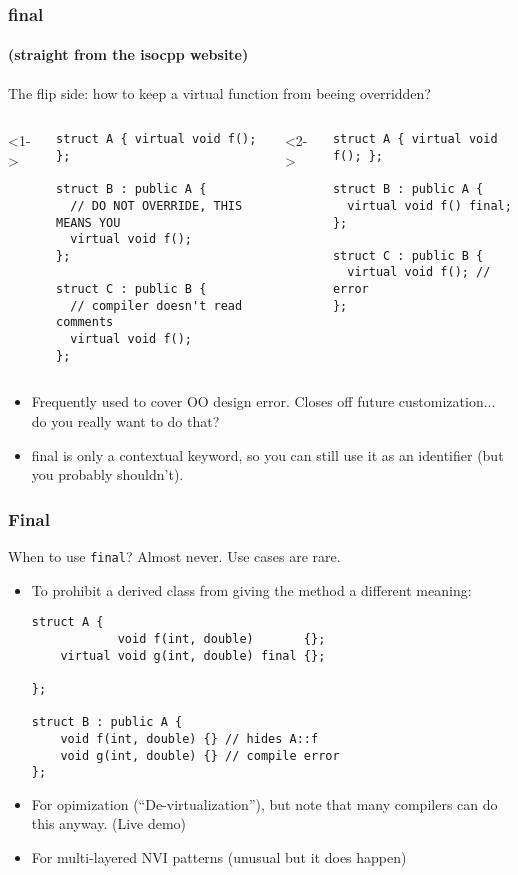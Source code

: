 \begin{frame}[fragile]
\frametitle{final}
\framesubtitle{(straight from the isocpp website)}
The flip side: how to keep a virtual function from beeing overridden?
\begin{columns}[t]
<1->
{\scriptsize
\begin{verbatim}
struct A { virtual void f(); };

struct B : public A {
  // DO NOT OVERRIDE, THIS MEANS YOU
  virtual void f();
};

struct C : public B {
  // compiler doesn't read comments
  virtual void f();
};
\end{verbatim}
}
<2->
{\scriptsize
\begin{verbatim}
struct A { virtual void f(); };

struct B : public A {
  virtual void f() final;
};

struct C : public B {
  virtual void f(); // error
};
\end{verbatim}
}
\end{columns}
\pause{}
\begin{itemize}
\item Frequently used to cover OO design error.  Closes off future
  customization... do you really want to do that?
\item final is only a contextual keyword, so you can still use it as
  an identifier (but you probably shouldn't).
\end{itemize}
\end{frame}


\begin{frame}[fragile]
\frametitle{Final}
When to use \texttt{final}?  Almost never.  Use cases are rare.
\begin{itemize}
\item To prohibit a derived class from giving the method a different
  meaning:
{\scriptsize
\begin{verbatim}
struct A { 
            void f(int, double)       {}; 
    virtual void g(int, double) final {}; 
    
};

struct B : public A {
    void f(int, double) {} // hides A::f
    void g(int, double) {} // compile error
};
\end{verbatim}}
\item For opimization (``De-virtualization''), but note that many
  compilers can do this anyway.  (Live demo)
\item For multi-layered NVI patterns (unusual but it does happen)
\end{itemize}
    
\end{frame}


